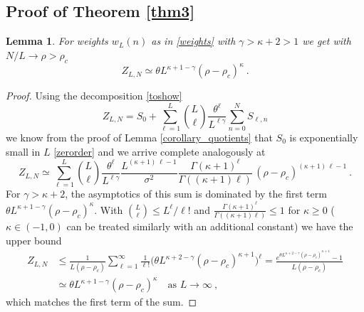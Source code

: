 \documentclass[pdflatex,sn-mathphys-num]{sn-jnl}%
\theoremstyle{thmstyleone}%
\newtheorem{lemma}[theorem]{Lemma}%
\theoremstyle{thmstyletwo}%
\theoremstyle{thmstylethree}%
\begin{document}
\subsection{Proof of Theorem \ref{thm3}}

\begin{lemma}
\label{zasymp3}
For weights $w_L(n)$ as in \eqref{weights} with $\gamma >\kappa +2> 1$ we get with $N/L\to\rho >\rho_c$
\[
Z_{L,N}\simeq \theta L^{\kappa +1 -\gamma} (\rho -\rho_c )^\kappa\ .
\]
\end{lemma}

\begin{proof}
Using the decomposition \eqref{toshow}
\[
Z_{L,N} =S_0 +\sum_{\ell =1}^L {L\choose\ell} \frac{\theta^\ell}{L^{\ell\gamma}} \sum_{n=0}^N S_{\ell ,n}
\]
we know from the proof of Lemma \ref{corollary_quotients} that $S_0$ is exponentially small in $L$ \eqref{zerorder} and we arrive complete analogously at
\[
Z_{L,N} \simeq \sum_{\ell =1}^{L} {L\choose\ell} \frac{\theta^\ell}{L^{\ell\gamma}} \frac{L^{(\kappa +1)\,\ell-1}}{\sigma^2} \frac{\Gamma(\kappa +1)^\ell}{\Gamma((\kappa +1)\ell )}\, (\rho -\rho_c )^{(\kappa +1)\,\ell-1}\ .
\]
For $\gamma >\kappa +2$, the asymptotics of this sum is dominated by the first term $\theta L^{\kappa +1-\gamma} (\rho-\rho_c )^\kappa$. With ${L\choose\ell }\leq L^\ell/ \ell !$ and $\frac{\Gamma(\kappa +1)^\ell}{\Gamma((\kappa +1)\ell )}\leq 1$ for $\kappa \geq 0$ ($\kappa\in (-1,0)$ can be treated similarly with an additional constant) we have the upper bound
\begin{align*}
    Z_{L,N} &\leq\frac{1}{L(\rho -\rho_c )}\sum_{\ell =1}^\infty \frac{1}{\ell !} \Big(\theta L^{\kappa +2-\gamma} (\rho -\rho_c)^{\kappa +1}\Big)^\ell =\frac{e^{\theta L^{\kappa +2-\gamma} (\rho -\rho_c)^{\kappa +1}}-1}{L(\rho -\rho_c)}\\
    &\simeq \theta L^{\kappa +1-\gamma} (\rho -\rho_c)^\kappa\quad\mbox{as }L\to\infty\ ,
\end{align*}
which matches the first term of the sum.
\end{proof}

\end{document}
